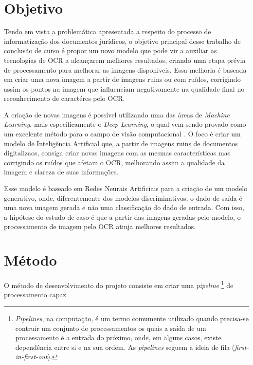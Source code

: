 \newpage

\section{Objetivo}

Tendo em vista a problemática apresentada a respeito do processo de informatização dos documentos jurídicos, o objetivo principal desse trabalho de conclusão de curso é propor um novo modelo que pode vir a auxiliar as tecnologias de OCR a alcançarem melhores resultados, criando uma etapa prévia de processamento para melhorar as imagens disponíveis. Essa melhoria é baseada em criar uma nova imagem a partir de imagens ruins ou com ruídos, corrigindo assim os pontos na imagem que influenciam negativamente na qualidade final no reconhecimento de caractéres pelo OCR.

A criação de novas imagens é possível utilizando uma das áreas de \textit{Machine Learning}, mais especificamente o \textit{Deep Learning}, o qual vem sendo provado como um excelente método para o campo de visão computacional \cite{dl-brief-review}. O foco é criar um modelo de Inteligência Artificial que, a partir de imagens ruins de documentos digitalizaos, consiga criar novas imagens com as mesmas características mas corrigindo os ruídos que afetam o OCR, melhorando assim a qualidade da imagem e clareza de suas informações.

Esse modelo é baseado em Redes Neurais Artificiais para a criação de um modelo generativo, onde, diferentemente dos modelos discriminativos, o dado de saída é uma nova imagem gerada e não uma classificação do dado de entrada. Com isso, a hipótese do estudo de caso é que a partir das imagens geradas pelo modelo, o processamento de imagem pelo OCR atinja melhores resultados.

\section{Método}

O método de desenvolvimento do projeto consiste em criar uma \textit{pipeline}
    \footnote{
        \textit{Pipelines}, na computação, é um termo comumente utilizado quando precisa-se contruir um conjunto de processamentos os quais a saída de um processamento é a entrada do próximo, onde, em alguns casos, existe dependência entre si e na sua ordem. As \textit{pipelines} seguem a ideia de fila (\textit{first-in-first-out}).
    }
de processamento capaz





